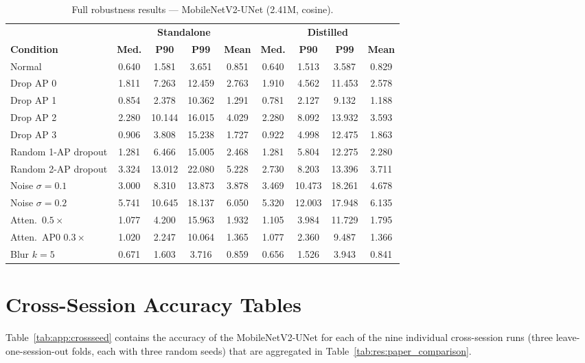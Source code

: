 \begin{table}[H]
\centering
\caption{Full robustness results --- MobileNetV2-UNet (2.41M, cosine).}
\label{tab:app:robust_unet}
\small
\begin{tabular}{@{}lcccc|cccc@{}}
\toprule
 & \multicolumn{4}{c|}{\textbf{Standalone}} & \multicolumn{4}{c}{\textbf{Distilled}} \\
\textbf{Condition} & \textbf{Med.} & \textbf{P90} & \textbf{P99} & \textbf{Mean} & \textbf{Med.} & \textbf{P90} & \textbf{P99} & \textbf{Mean} \\
\midrule
Normal                 & 0.640 & 1.581 & 3.651  & 0.851 & 0.640 & 1.513 & 3.587  & 0.829 \\
Drop AP 0              & 1.811 & 7.263 & 12.459 & 2.763 & 1.910 & 4.562 & 11.453 & 2.578 \\
Drop AP 1              & 0.854 & 2.378 & 10.362 & 1.291 & 0.781 & 2.127 & 9.132  & 1.188 \\
Drop AP 2              & 2.280 & 10.144& 16.015 & 4.029 & 2.280 & 8.092 & 13.932 & 3.593 \\
Drop AP 3              & 0.906 & 3.808 & 15.238 & 1.727 & 0.922 & 4.998 & 12.475 & 1.863 \\
Random 1-AP dropout    & 1.281 & 6.466 & 15.005 & 2.468 & 1.281 & 5.804 & 12.275 & 2.280 \\
Random 2-AP dropout    & 3.324 & 13.012& 22.080 & 5.228 & 2.730 & 8.203 & 13.396 & 3.711 \\
Noise $\sigma{=}0.1$   & 3.000 & 8.310 & 13.873 & 3.878 & 3.469 & 10.473& 18.261 & 4.678 \\
Noise $\sigma{=}0.2$   & 5.741 & 10.645& 18.137 & 6.050 & 5.320 & 12.003& 17.948 & 6.135 \\
Atten.\ $0.5\times$    & 1.077 & 4.200 & 15.963 & 1.932 & 1.105 & 3.984 & 11.729 & 1.795 \\
Atten.\ AP0 $0.3\times$& 1.020 & 2.247 & 10.064 & 1.365 & 1.077 & 2.360 & 9.487  & 1.366 \\
Blur $k{=}5$           & 0.671 & 1.603 & 3.716  & 0.859 & 0.656 & 1.526 & 3.943  & 0.841 \\
\bottomrule
\end{tabular}
\end{table}

\section{Cross-Session Accuracy Tables}
\label{app:crossseed}

Table~\ref{tab:app:crossseed} contains the accuracy of the MobileNetV2-UNet for each of the nine
individual cross-session runs (three leave-one-session-out folds, each with three random seeds) that are
aggregated in Table~\ref{tab:res:paper_comparison}.

